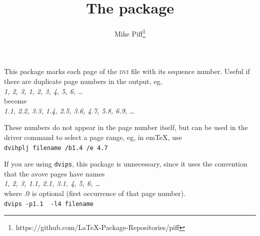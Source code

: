 \documentclass[pagesize=auto, fontsize=14pt, parskip=half, DIV=10]{scrartcl}
\title{The \pkg{duplicat} package}
\author{Mike Piff\thanks{https://github.com/LaTeX-Package-Repositories/piff}}
\date{}
\begin{document}
\maketitle

\noindent
This package marks each page of the \textsc{dvi} file with its sequence number.
Useful if there are duplicate page numbers in the output, eg,\\
\textit{1, 2, 3, 1, 2, 3, 4, 5, 6, \dots}\\
become\\
\textit{1.1, 2.2, 3.3, 1.4, 2.5, 3.6, 4.7, 5.8, 6.9, \dots}

These numbers do not appear in the page number itself, but can be used
in the driver command to select a page range, eg, in em\TeX, use\\
\verb|dvihplj filename /b1.4 /e 4.7|

If you are using \texttt{dvips}, this package is unnecessary, since it uses the
convention that the avove pages have names\\
\textit{1, 2, 3, 1.1, 2.1, 3.1, 4, 5, 6, \dots}\\
where .0 is optional (first occurrence of that page number).\\
\verb|dvips -p1.1  -l4 filename|
\end{document}
